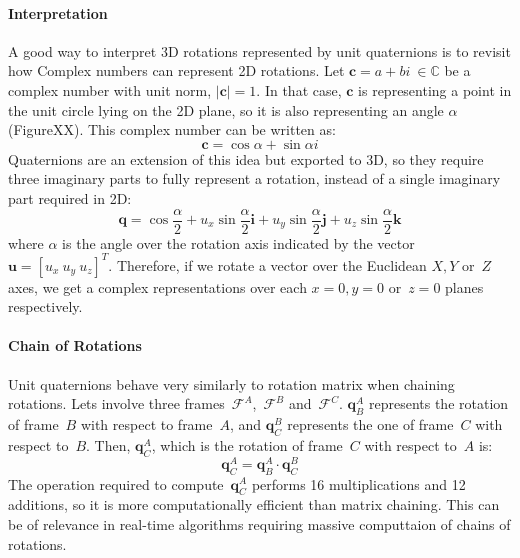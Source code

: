 \paragraph{Interpretation}
A good way to interpret 3D rotations represented by unit quaternions is to revisit how Complex numbers can represent 2D rotations. Let $\mathbf{c}=a+bi\ \in\mathbb{C}$ be a complex number with unit norm, $|\mathbf{c}|=1$. In that case, $\mathbf{c}$ is representing a point in the unit circle lying on the 2D plane, so it is also representing an angle $\alpha$ (FigureXX). This complex number can be written as:
\begin{equation}
 \mathbf{c} = \cos\alpha + \sin\alpha i
\end{equation}
Quaternions are an extension of this idea but exported to 3D, so they require three imaginary parts to fully represent a rotation, instead of a single imaginary part required in 2D:
\begin{equation}
 \mathbf{q} = \cos\frac{\alpha}{2} + u_x\sin\frac{\alpha}{2} \mathbf{i} + u_y\sin\frac{\alpha}{2} \mathbf{j} + u_z\sin\frac{\alpha}{2} \mathbf{k}
\end{equation}
where $\alpha$ is the angle over the rotation axis indicated by the vector $\mathbf{u}=[u_x\ u_y\ u_z]^T$. Therefore, if we rotate a vector over the Euclidean $X,Y$ or~$Z$ axes, we get a complex representations over each $x=0,y=0$ or~$z=0$ planes respectively. 

\paragraph{Chain of Rotations}
Unit quaternions behave very similarly to rotation matrix when chaining rotations. Lets involve three frames~$\mathcal{F}^A$,~$\mathcal{F}^B$ and~$\mathcal{F}^C$. $\mathbf{q}^A_B$ represents the rotation of frame~$B$ with respect to frame~$A$, and $\mathbf{q}^B_C$ represents the one of frame~$C$ with respect to~$B$. Then, $\mathbf{q}^A_C$, which is the rotation of frame~$C$ with respect to~$A$ is:
\begin{equation}
 \mathbf{q}^A_C = \mathbf{q}^A_B \cdot \mathbf{q}^B_C
\end{equation}
The operation required to compute~$\mathbf{q}^A_C$ performs 16 multiplications and 12 additions, so it is more computationally efficient than matrix chaining. This can be of relevance in real-time algorithms requiring massive computtaion of chains of rotations.

